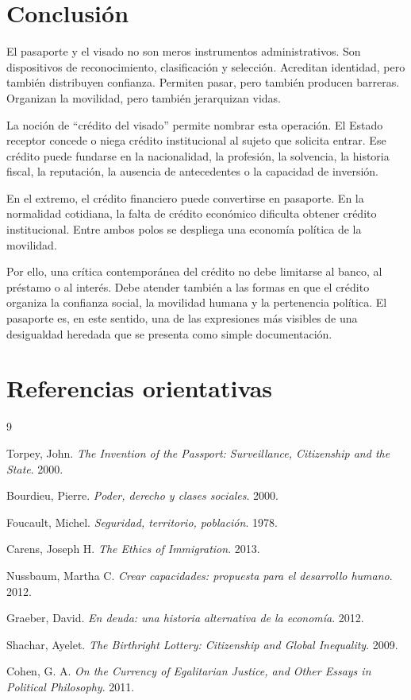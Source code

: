 \documentclass[12pt,a4paper]{article}
\begin{document}
\section*{Conclusión}

El pasaporte y el visado no son meros instrumentos administrativos. Son dispositivos de reconocimiento, clasificación y selección. Acreditan identidad, pero también distribuyen confianza. Permiten pasar, pero también producen barreras. Organizan la movilidad, pero también jerarquizan vidas.

La noción de ``crédito del visado'' permite nombrar esta operación. El Estado receptor concede o niega crédito institucional al sujeto que solicita entrar. Ese crédito puede fundarse en la nacionalidad, la profesión, la solvencia, la historia fiscal, la reputación, la ausencia de antecedentes o la capacidad de inversión.

En el extremo, el crédito financiero puede convertirse en pasaporte. En la normalidad cotidiana, la falta de crédito económico dificulta obtener crédito institucional. Entre ambos polos se despliega una economía política de la movilidad.

Por ello, una crítica contemporánea del crédito no debe limitarse al banco, al préstamo o al interés. Debe atender también a las formas en que el crédito organiza la confianza social, la movilidad humana y la pertenencia política. El pasaporte es, en este sentido, una de las expresiones más visibles de una desigualdad heredada que se presenta como simple documentación.

\section*{Referencias orientativas}

\begin{thebibliography}{9}

Torpey, John.
\textit{The Invention of the Passport: Surveillance, Citizenship and the State}. 2000.

Bourdieu, Pierre.
\textit{Poder, derecho y clases sociales}. 2000.

Foucault, Michel.
\textit{Seguridad, territorio, población}. 1978.

Carens, Joseph H.
\textit{The Ethics of Immigration}. 2013.

Nussbaum, Martha C.
\textit{Crear capacidades: propuesta para el desarrollo humano}. 2012.

Graeber, David.
\textit{En deuda: una historia alternativa de la economía}. 2012.

Shachar, Ayelet.
\textit{The Birthright Lottery: Citizenship and Global Inequality}. 2009.

Cohen, G. A.
\textit{On the Currency of Egalitarian Justice, and Other Essays in Political Philosophy}. 2011.

\end{thebibliography}
\end{document}
